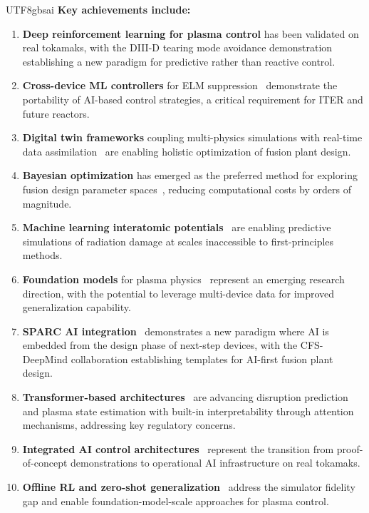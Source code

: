 \documentclass[12pt,a4paper]{article}
\begin{document}
\begin{CJK}{UTF8}{gbsai}
\textbf{Key achievements include:}

\begin{enumerate}
\item \textbf{Deep reinforcement learning for plasma control} has been validated on real tokamaks, with the DIII-D tearing mode avoidance demonstration~\citep{Seo2024Nature} establishing a new paradigm for predictive rather than reactive control.
\item \textbf{Cross-device ML controllers} for ELM suppression~\citep{Kim2024APSDPP} demonstrate the portability of AI-based control strategies, a critical requirement for ITER and future reactors.
\item \textbf{Digital twin frameworks} coupling multi-physics simulations with real-time data assimilation~\citep{Chen2024DT,Kemp2024STEP} are enabling holistic optimization of fusion plant design.
\item \textbf{Bayesian optimization} has emerged as the preferred method for exploring fusion design parameter spaces~\citep{Griffiths2025,Kolemen2024BO}, reducing computational costs by orders of magnitude.
\item \textbf{Machine learning interatomic potentials}~\citep{Byggmastar2024,Ghafarollahi2024,Mianowska2024} are enabling predictive simulations of radiation damage at scales inaccessible to first-principles methods.
\item \textbf{Foundation models} for plasma physics~\citep{Zhu2025,Davies2025,Gopakumar2025} represent an emerging research direction, with the potential to leverage multi-device data for improved generalization capability.
\item \textbf{SPARC AI integration}~\citep{CFS2025DeepMind,Rodriguez2025SPARC} demonstrates a new paradigm where AI is embedded from the design phase of next-step devices, with the CFS-DeepMind collaboration establishing templates for AI-first fusion plant design.
\item \textbf{Transformer-based architectures}~\citep{Pangioni2025,Rea2025} are advancing disruption prediction and plasma state estimation with built-in interpretability through attention mechanisms, addressing key regulatory concerns.
\item \textbf{Integrated AI control architectures}~\citep{Rothstein2025PACMAN} represent the transition from proof-of-concept demonstrations to operational AI infrastructure on real tokamaks.
\item \textbf{Offline RL and zero-shot generalization}~\citep{Sonker2026,Wu2025,Sorokin2026} address the simulator fidelity gap and enable foundation-model-scale approaches for plasma control.
\end{enumerate}


\end{CJK}
\end{document}
